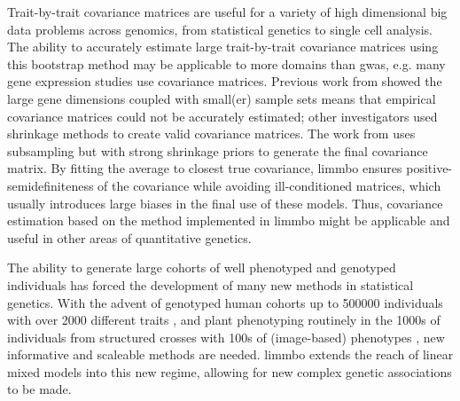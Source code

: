 Trait-by-trait covariance matrices are useful for a variety of high dimensional big data problems across genomics, from statistical genetics to single cell analysis. The ability to accurately estimate large trait-by-trait covariance matrices using this bootstrap method may be applicable to more domains than \gls{gwas}, e.g. many gene expression studies use covariance matrices. Previous work from \citet{Schaefer2005} showed the large gene dimensions coupled with small(er) sample sets means that empirical covariance matrices could not be accurately estimated; other investigators \citep{Ledoit2004,Furrer2007,Bickel2008} used shrinkage methods to create valid covariance matrices. The work from \citet{Teng2009} uses subsampling but with strong shrinkage priors to generate the final covariance matrix. By fitting the average to closest true covariance, \gls{limmbo} ensures positive-semidefiniteness of the covariance while avoiding ill-conditioned matrices, which usually introduces large biases in the final use of these models. Thus, covariance estimation based on the method implemented in \gls{limmbo} might be applicable and useful in other areas of quantitative genetics.  

The ability to generate large cohorts of well phenotyped and genotyped individuals has forced the development of many new methods in statistical genetics. With the advent of genotyped human cohorts up to \num{500000} individuals with over \num{2000} different traits \citep{Sudlow2015}, and plant phenotyping routinely in the \num{1000}s of individuals from structured crosses with \num{100}s of (image-based) phenotypes \citep{Atwell2010,Yang2014}, new informative and scaleable methods are needed. \gls{limmbo} extends the reach of linear mixed models into this new regime, allowing for new complex genetic associations to be made.
